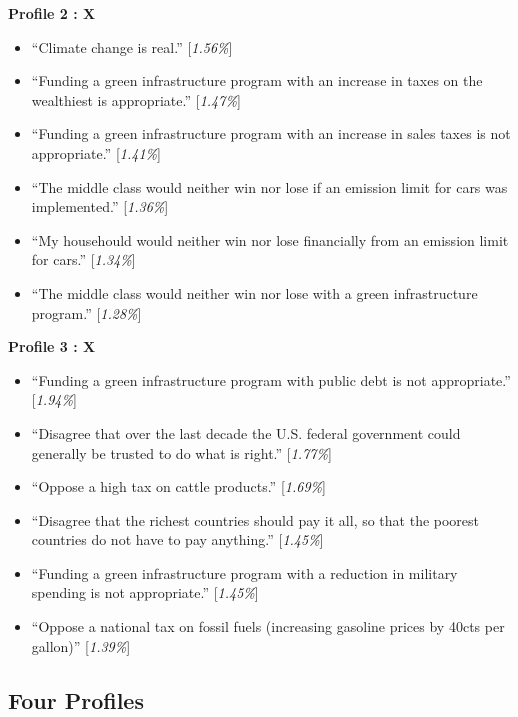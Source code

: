 \documentclass{article}
\begin{document}
\textbf{Profile 2 : X}
\begin{itemize}
\item ``Climate change is real.'' [\textit{1.56\%}]
\item ``Funding a green infrastructure program with an increase in taxes on the wealthiest is appropriate.'' [\textit{1.47\%}]
\item ``Funding a green infrastructure program with an increase in sales taxes is not appropriate.'' [\textit{1.41\%}]
\item ``The middle class would neither win nor lose if an emission limit for cars was implemented.'' [\textit{1.36\%}]
\item ``My househould would neither win nor lose financially from an emission limit for cars.'' [\textit{1.34\%}]
\item ``The middle class would neither win nor lose with a green infrastructure program.'' [\textit{1.28\%}]
\end{itemize}

\textbf{Profile 3 : X}
\begin{itemize}
\item ``Funding a green infrastructure program with public debt is not appropriate.'' [\textit{1.94\%}]
\item ``Disagree that over the last decade the U.S. federal government could generally be trusted to do what is right.'' [\textit{1.77\%}]
\item ``Oppose a high tax on cattle products.'' [\textit{1.69\%}]
\item ``Disagree that the richest countries should pay it all, so that the poorest countries do not have to pay anything.'' [\textit{1.45\%}]
\item ``Funding a green infrastructure program with a reduction in military spending is not appropriate.'' [\textit{1.45\%}]
\item ``Oppose a national tax on fossil fuels (increasing gasoline prices by 40cts per gallon)'' [\textit{1.39\%}]
\end{itemize}

\subsection{Four Profiles}
\end{document}
